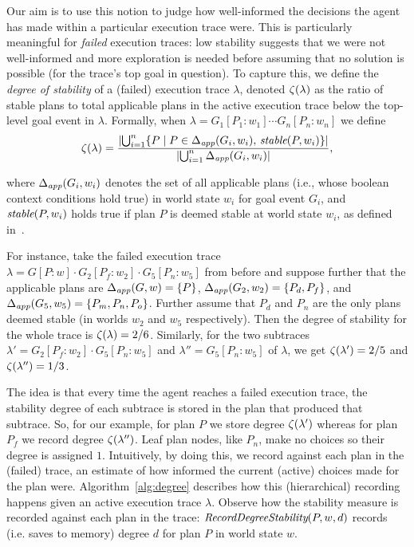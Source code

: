 Our aim is to use this notion to judge how  well-informed the decisions the agent has made within a particular execution trace were. This is particularly meaningful for \emph{failed} execution traces: low stability suggests that we were not well-informed and more exploration is needed before assuming that no solution is possible (for the trace's top goal in question).
To capture this, we define the \emph{degree of stability} of a (failed) execution trace $\lambda$, denoted $\zeta(\lambda)$ as the ratio of stable plans to total applicable plans in the active execution trace below the top-level goal event in $\lambda$. Formally, when $\lambda= G_1[P_1:w_1] \cdots G_n[P_n:w_n]$ we define 
\[
\zeta(\lambda) = 
	\frac{ 
			|{ \bigcup_{i=1}^n \{P \mid P \in \Delta_{\operatorname{\textit{app}}}(G_i,w_i),\, \operatorname{\textit{stable}}(P,w_i)\} }| 
		}
		{
			|{	\bigcup_{i=1}^n \Delta_{\operatorname{\textit{app}}}(G_i,w_i) }| 
		},
\]

\noindent
where  $\Delta_{\operatorname{\textit{app}}}(G_i,w_i)$ denotes the set of all applicable plans (i.e., whose boolean context conditions hold true) in world state $w_i$ for goal event $G_i$, and $\operatorname{\textit{stable}}(P,w_i)$ holds true if plan $P$ is deemed stable at world state $w_i$, as defined in~\cite{singh10:learning}.

For instance, take the failed execution trace $\lambda = G[P:w] \cdot G_2[P_f:w_2] \cdot G_5[P_n:w_5]$ from before and suppose further that the applicable plans are $\Delta_{\operatorname{\textit{app}}}(G,w) = \{P\}$, $\Delta_{\operatorname{\textit{app}}}(G_2,w_2) = \{P_d,P_f\}$, and $\Delta_{\operatorname{\textit{app}}}(G_5,w_5) = \{P_m,P_n,P_o\}$. Further assume that $P_d$ and $P_n$ are the only plans deemed stable (in worlds $w_2$ and $w_5$ respectively). 
Then the degree of stability for the whole trace is $\zeta(\lambda)= 2/6$.
Similarly, for the two subtraces $\lambda'= G_2[P_f:w_2] \cdot G_5[P_n:w_5]$ and $\lambda'' =G_5[P_n:w_5]$ of $\lambda$, we get $\zeta(\lambda') = 2/5$ and $\zeta(\lambda'') = 1/3$.



\newcommand{\StablePlan}{\mathname{StablePlan}}
\newcommand{\SetDegreeStability}{\mathname{RecordDegreeStability}}
\newcommand{\UpdateDegreeStability}{\mathname{RecordDegreeStabilityInTrace}}

The idea is that every time the agent reaches a failed execution trace, the stability degree of each subtrace is stored in the plan that produced that subtrace.
So, for our example, for plan $P$ we store degree $\zeta(\lambda')$ whereas for plan $P_f$ we record degree $\zeta(\lambda'')$. Leaf plan nodes, like $P_n$, make no choices so their degree is assigned $1$.
Intuitively, by doing this, we record against each plan in the (failed) trace, an estimate of how informed the current (active) choices made for the plan were.  
Algorithm~\ref{alg:degree} describes how this (hierarchical) recording happens given an active execution trace $\lambda$. Observe how the stability measure is recorded against each plan in the trace: $\SetDegreeStability(P, w, d)$ records (i.e. saves to memory) degree $d$ for plan $P$ in world state $w$.

